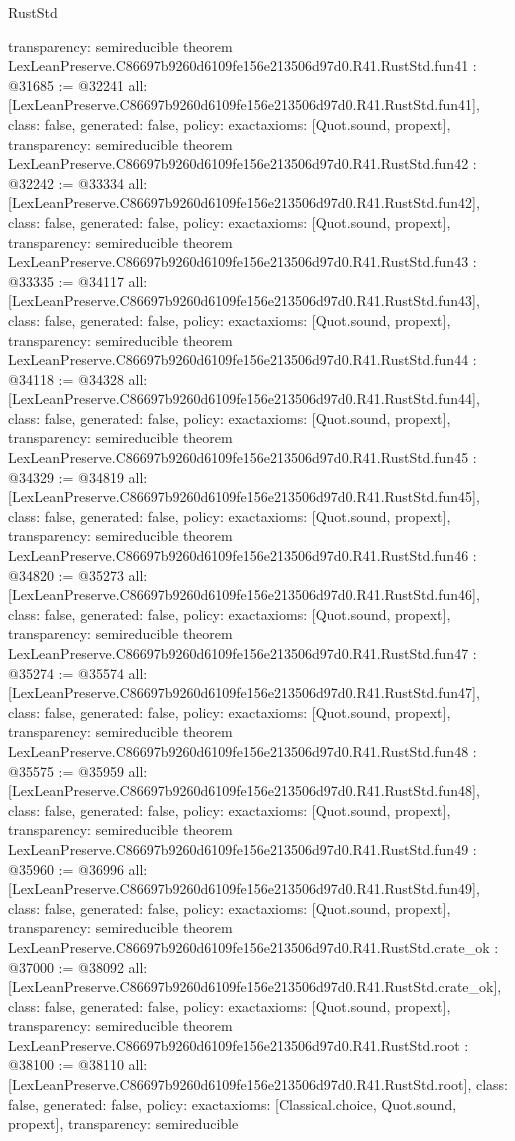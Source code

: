 \begin{lexlean}{RustStd}
\begin{coremodule}
{  transparency: semireducible
}
theorem LexLeanPreserve.C86697b9260d6109fe156e213506d97d0.R41.RustStd.fun41 : @31685 := @32241 {
  all: [LexLeanPreserve.C86697b9260d6109fe156e213506d97d0.R41.RustStd.fun41],
  class: false,
  generated: false,
  policy: exact{axioms: [Quot.sound, propext]},
  transparency: semireducible
}
theorem LexLeanPreserve.C86697b9260d6109fe156e213506d97d0.R41.RustStd.fun42 : @32242 := @33334 {
  all: [LexLeanPreserve.C86697b9260d6109fe156e213506d97d0.R41.RustStd.fun42],
  class: false,
  generated: false,
  policy: exact{axioms: [Quot.sound, propext]},
  transparency: semireducible
}
theorem LexLeanPreserve.C86697b9260d6109fe156e213506d97d0.R41.RustStd.fun43 : @33335 := @34117 {
  all: [LexLeanPreserve.C86697b9260d6109fe156e213506d97d0.R41.RustStd.fun43],
  class: false,
  generated: false,
  policy: exact{axioms: [Quot.sound, propext]},
  transparency: semireducible
}
theorem LexLeanPreserve.C86697b9260d6109fe156e213506d97d0.R41.RustStd.fun44 : @34118 := @34328 {
  all: [LexLeanPreserve.C86697b9260d6109fe156e213506d97d0.R41.RustStd.fun44],
  class: false,
  generated: false,
  policy: exact{axioms: [Quot.sound, propext]},
  transparency: semireducible
}
theorem LexLeanPreserve.C86697b9260d6109fe156e213506d97d0.R41.RustStd.fun45 : @34329 := @34819 {
  all: [LexLeanPreserve.C86697b9260d6109fe156e213506d97d0.R41.RustStd.fun45],
  class: false,
  generated: false,
  policy: exact{axioms: [Quot.sound, propext]},
  transparency: semireducible
}
theorem LexLeanPreserve.C86697b9260d6109fe156e213506d97d0.R41.RustStd.fun46 : @34820 := @35273 {
  all: [LexLeanPreserve.C86697b9260d6109fe156e213506d97d0.R41.RustStd.fun46],
  class: false,
  generated: false,
  policy: exact{axioms: [Quot.sound, propext]},
  transparency: semireducible
}
theorem LexLeanPreserve.C86697b9260d6109fe156e213506d97d0.R41.RustStd.fun47 : @35274 := @35574 {
  all: [LexLeanPreserve.C86697b9260d6109fe156e213506d97d0.R41.RustStd.fun47],
  class: false,
  generated: false,
  policy: exact{axioms: [Quot.sound, propext]},
  transparency: semireducible
}
theorem LexLeanPreserve.C86697b9260d6109fe156e213506d97d0.R41.RustStd.fun48 : @35575 := @35959 {
  all: [LexLeanPreserve.C86697b9260d6109fe156e213506d97d0.R41.RustStd.fun48],
  class: false,
  generated: false,
  policy: exact{axioms: [Quot.sound, propext]},
  transparency: semireducible
}
theorem LexLeanPreserve.C86697b9260d6109fe156e213506d97d0.R41.RustStd.fun49 : @35960 := @36996 {
  all: [LexLeanPreserve.C86697b9260d6109fe156e213506d97d0.R41.RustStd.fun49],
  class: false,
  generated: false,
  policy: exact{axioms: [Quot.sound, propext]},
  transparency: semireducible
}
theorem LexLeanPreserve.C86697b9260d6109fe156e213506d97d0.R41.RustStd.crate_ok : @37000 := @38092 {
  all: [LexLeanPreserve.C86697b9260d6109fe156e213506d97d0.R41.RustStd.crate_ok],
  class: false,
  generated: false,
  policy: exact{axioms: [Quot.sound, propext]},
  transparency: semireducible
}
theorem LexLeanPreserve.C86697b9260d6109fe156e213506d97d0.R41.RustStd.root : @38100 := @38110 {
  all: [LexLeanPreserve.C86697b9260d6109fe156e213506d97d0.R41.RustStd.root],
  class: false,
  generated: false,
  policy: exact{axioms: [Classical.choice, Quot.sound, propext]},
  transparency: semireducible
}


\end{coremodule}
\end{lexlean}
